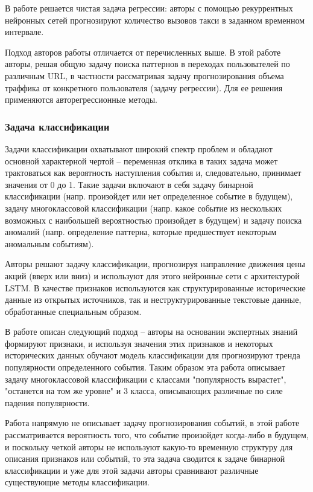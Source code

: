 В работе \cite{uber_mulitvar_forecasting} решается чистая задача регрессии: авторы с помощью рекуррентных нейронных сетей прогнозируют количество вызовов такси в заданном временном интервале. 

Подход авторов работы \cite{triplet_event_forecasting} отличается от перечисленных выше. В этой работе авторы, решая общую задачу поиска паттернов в переходах пользователей по различным URL, в частности рассматривая задачу прогнозирования объема траффика от конкретного пользователя (задачу регрессии). Для ее решения применяются авторегрессионные методы.

\subsubsection{Задача классификации}
Задачи классификации охватывают широкий спектр проблем и обладают основной характерной чертой -- переменная отклика в таких задача может трактоваться как вероятность наступления события и, следовательно, принимает значения от 0 до 1. Такие задачи включают в себя задачу бинарной классификации (напр. произойдет или нет определенное событие в будущем), задачу многоклассовой классификации (напр. какое событие из нескольких возможных с наибольшей вероятностью произойдет в будущем) и задачу поиска аномалий (напр. определение паттерна, которые предшествует некоторым аномальным событиям).

Авторы \cite{struct_unstruct_prediction} решают задачу классификации, прогнозируя направление движения цены акций (вверх или вниз) и используют для этого нейронные сети с архитектурой LSTM. В качестве признаков используются как структурированные исторические данные из открытых источников, так и неструктурированные текстовые данные, обработанные специальным образом.

В работе \cite{twitter_predicting} описан следующий подход -- авторы на основании экспертных знаний формируют признаки, и используя значения этих признаков и некоторых исторических данных обучают модель классификации для прогнозируют тренда популярности определенного события. Таким образом эта работа описывает задачу многоклассовой классификации с классами "популярность вырастет", "останется на том же уровне" и 3 класса, описывающих различные по силе падения популярности.

Работа \cite{comparison_coronary_heart_disease} напрямую не описывает задачу прогнозирования событий, в этой работе рассматривается вероятность того, что событие произойдет когда-либо в будущем, и поскольку четкой авторы не используют какую-то временн\textit{у}ю структуру для описания признаков или событий, то эта задача сводится к задаче бинарной классификации и уже для этой задачи авторы сравнивают различные существующие методы классификации.

